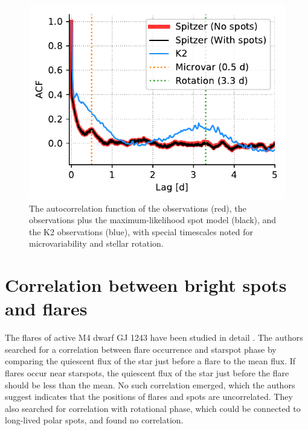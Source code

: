 \begin{figure}
\begin{center}
\includegraphics[scale=0.8]{trappist1_bright/acf_sanity.pdf}
\end{center}
\caption{The autocorrelation function of the \spitzer observations (red), the \spitzer observations plus the maximum-likelihood spot model (black), and the K2 observations (blue), with special timescales noted for microvariability and stellar rotation. \label{fig:acf}}
\end{figure}


\section{Correlation between bright spots and flares} \label{correlation}

The flares of active M4 dwarf GJ 1243 have been studied in detail \citep{Hawley2014, Davenport2014}. The authors searched for a correlation between flare occurrence and starspot phase by comparing the quiescent flux of the star just before a flare to the mean flux. If flares occur near starspots, the quiescent flux of the star just before the flare should be less than the mean. No such correlation emerged, which the authors suggest indicates that the positions of flares and spots are uncorrelated. They also searched for correlation with rotational phase, which could be connected to long-lived polar spots, and found no correlation.

